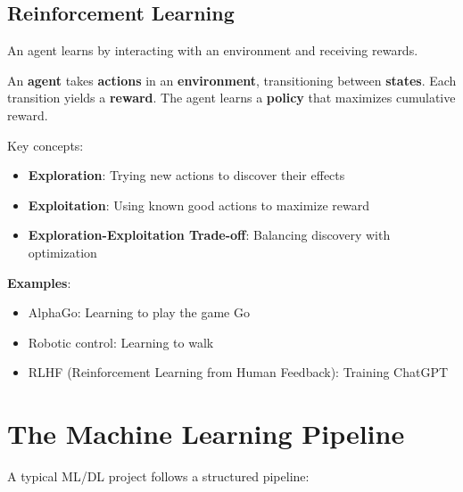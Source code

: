 \subsection{Reinforcement Learning}

An agent learns by interacting with an environment and receiving rewards.

\begin{definitionbox}
An \textbf{agent} takes \textbf{actions} in an \textbf{environment}, transitioning between \textbf{states}. Each transition yields a \textbf{reward}. The agent learns a \textbf{policy} that maximizes cumulative reward.
\end{definitionbox}

Key concepts:
\begin{itemize}
    \item \textbf{Exploration}: Trying new actions to discover their effects
    \item \textbf{Exploitation}: Using known good actions to maximize reward
    \item \textbf{Exploration-Exploitation Trade-off}: Balancing discovery with optimization
\end{itemize}

\textbf{Examples}:
\begin{itemize}
    \item AlphaGo: Learning to play the game Go
    \item Robotic control: Learning to walk
    \item RLHF (Reinforcement Learning from Human Feedback): Training ChatGPT
\end{itemize}


\section{The Machine Learning Pipeline}

A typical ML/DL project follows a structured pipeline:

